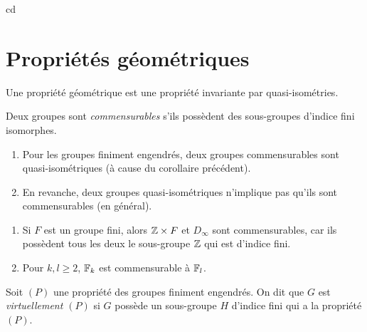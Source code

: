 cd %

\chapter{Propriétés géométriques}
\label{cha:propr-geom}

  Une propriété géométrique est une propriété invariante par quasi-isométries.


  \begin{defi} 
    Deux groupes sont \emph{commensurables} s'ils possèdent des sous-groupes d'indice fini isomorphes.
  \end{defi}

  \begin{rems}
    \begin{enumerate}
    \item Pour les groupes finiment engendrés, deux groupes commensurables sont quasi-isométriques (à cause du
      corollaire précédent).
    \item En revanche, deux groupes quasi-isométriques n'implique pas qu'ils sont commensurables (en général).
    \end{enumerate}
  \end{rems}

  \begin{exs}
    \begin{enumerate}
    \item Si $F$ est un groupe fini, alors $\mathbb{Z} \times F$ et $D_\infty$ sont commensurables, car ils possèdent
      tous les deux le sous-groupe $\mathbb{Z}$ qui est d'indice fini.

    \item Pour $k, l \geq 2$, $\mathbb{F}_k$ est commensurable à $\mathbb{F}_l$.
    \end{enumerate}
  \end{exs}

  \begin{defi}
    Soit $(P)$ une propriété des groupes finiment engendrés. On dit que $G$ est \emph{virtuellement $(P)$}
     si $G$ possède un sous-groupe $H$ d'indice fini qui a la propriété $(P)$.
  \end{defi}

